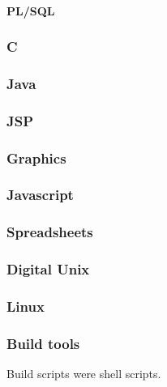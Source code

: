 \documentclass[letterpaper,10pt,english]{sphinxmanual}
\begin{document}
\paragraph{PL/SQL}
\label{\detokenize{Contributions:pl-sql}}

\subsubsection{C}
\label{\detokenize{Contributions:id2}}

\subsubsection{Java}
\label{\detokenize{Contributions:id3}}

\subsubsection{JSP}
\label{\detokenize{Contributions:jsp}}

\subsubsection{Graphics}
\label{\detokenize{Contributions:graphics}}

\subsubsection{Javascript}
\label{\detokenize{Contributions:javascript}}

\subsubsection{Spreadsheets}
\label{\detokenize{Contributions:spreadsheets}}

\subsubsection{Digital Unix}
\label{\detokenize{Contributions:digital-unix}}

\subsubsection{Linux}
\label{\detokenize{Contributions:linux}}

\subsubsection{Build tools}
\label{\detokenize{Contributions:build-tools}}
Build scripts were shell scripts.
\end{document}
